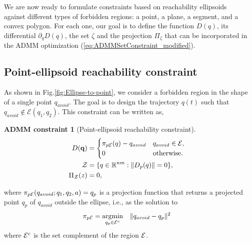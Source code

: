 \documentclass[journal]{IEEEtran}  %
\newtheorem{constraint}{ADMM constraint}
\def\sZ{\mathcal{Z}}
\begin{document}
We are now ready to formulate constraints based on reachability ellipsoids against different types of forbidden regions: a point, a plane, a segment, and a convex polygon. For each one, our goal is to define the function $D(q)$, its differential $\partial_qD(q)$, the set $\zeta$ and the projection $\Pi_\zeta$ that can be incorporated in the ADMM optimization (\ref{eq:ADMMSetConstraint_modified}).

\subsection{Point-ellipsoid reachability constraint}\label{sec:ellipsoid-point}
As shown in Fig.\ref{fig:Ellipse-to-point}, we consider a forbidden region in the shape of a single point $q_{avoid}$. The goal is to design the trajectory $q(t)$ such that $q_{avoid}\notin\mathcal{E}(q_1,q_2)$. This constraint can be written as, 

\begin{constraint}[Point-ellipsoid reachability constraint]
\begin{align}
D(\vq) &=  \begin{cases}
      \pi_{p\cE}(q) - q_{avoid} & q_{avoid} \in \cE, \\
      {0} & \textrm{otherwise}.
    \end{cases} \label{eq:point_ellipsoid_constraint}\\
  \sZ &= \{q\in\mathbb{R}^{nm}:\norm{D_p(q)} = 0 \},\\
   \Pi_\sZ(z) & = 0, 
\end{align}
\end{constraint}

where $\pi_{p\mathcal{E}}(q_{avoid};q_1,q_2,a) = q_p$ is a projection function that returns a projected point $q_p$ of $q_{avoid}$ outside the ellipse, i.e., as the solution to
\begin{equation}\label{eq:ellipse-point-projection}
\pi_{p\mathcal{E}}=\operatorname*{\arg\!\min}_{q_p\in\mathcal{E}^c} \quad \lVert q_{avoid}-q_p\rVert^2 
\end{equation}
where $\mathcal{E}^{c}$ is the set complement of the region $\mathcal{E}$.
  
\end{document}
